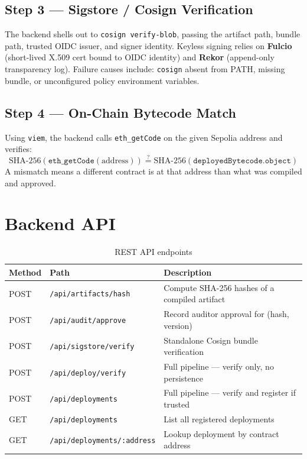 \documentclass[11pt,a4paper]{article}
\begin{document}
\subsection{Step 3 — Sigstore / Cosign Verification}
The backend shells out to \texttt{cosign verify-blob}, passing the artifact path, bundle
path, trusted OIDC issuer, and signer identity. Keyless signing relies on
\textbf{Fulcio} (short-lived X.509 cert bound to OIDC identity) and
\textbf{Rekor} (append-only transparency log). Failure causes include: \texttt{cosign}
absent from PATH, missing bundle, or unconfigured policy environment variables.

\subsection{Step 4 — On-Chain Bytecode Match}
Using \texttt{viem}, the backend calls \texttt{eth\_getCode} on the given Sepolia address
and verifies:
\[
\text{SHA-256}\!\left(\texttt{eth\_getCode}(\text{address})\right) \stackrel{?}{=}
\text{SHA-256}\!\left(\texttt{deployedBytecode.object}\right)
\]
A mismatch means a different contract is at that address than what was compiled and approved.

\section{Backend API}

\begin{table}[H]
\centering\small
\caption{REST API endpoints}
\begin{tabularx}{\textwidth}{llX}
\toprule
\textbf{Method} & \textbf{Path} & \textbf{Description}\\
\midrule
POST & \texttt{/api/artifacts/hash}        & Compute SHA-256 hashes of a compiled artifact\\
POST & \texttt{/api/audit/approve}         & Record auditor approval for (hash, version)\\
POST & \texttt{/api/sigstore/verify}       & Standalone Cosign bundle verification\\
POST & \texttt{/api/deploy/verify}         & Full pipeline — verify only, no persistence\\
POST & \texttt{/api/deployments}           & Full pipeline — verify and register if trusted\\
GET  & \texttt{/api/deployments}           & List all registered deployments\\
GET  & \texttt{/api/deployments/:address}  & Lookup deployment by contract address\\
\bottomrule
\end{tabularx}
\end{table}
\end{document}
